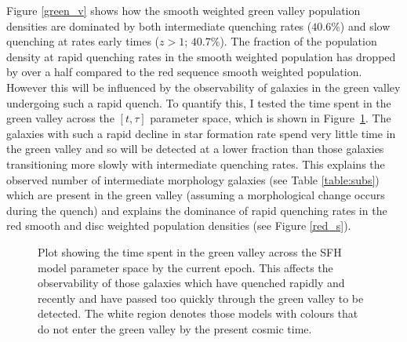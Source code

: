 Figure \ref{green_v} shows how the smooth weighted green valley population densities are dominated by both intermediate quenching rates ($40.6\%$) and slow quenching at rates early times ($z > 1$; $40.7\%$). The fraction of the population density at rapid quenching rates in the smooth weighted population has dropped by over a half compared to the red sequence smooth weighted population. However this will be influenced by the observability of galaxies in the green valley undergoing such a rapid quench. To quantify this, I tested the time spent in the green valley across the $[t, \tau]$ parameter space, which is shown in Figure~\ref{fig:timeingv}. The galaxies with such a rapid decline in star formation rate spend very little time in the green valley and so will be detected at a lower fraction than those galaxies transitioning more slowly with intermediate quenching rates.  This explains the observed number of intermediate morphology galaxies (see Table \ref{table:subs}) which are present in the green valley (assuming a morphological change occurs during the quench) and explains the dominance of rapid quenching rates in the red smooth and disc weighted population densities (see Figure \ref{red_s}).

\begin{figure}
\caption[Time spent in the green valley across parameter space]{Plot showing the time spent in the green valley across the SFH model parameter space by the current epoch. This affects the observability of those galaxies which have quenched rapidly and recently and have passed too quickly through the green valley to be detected. The white region denotes those models with colours that do not enter the green valley by the present cosmic time.}
\label{fig:timeingv}
\end{figure}

